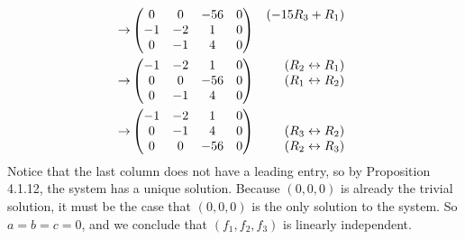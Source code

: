 \documentclass[12pt]{article}
\newenvironment{problem}[2][Problem]
{
	\begin{trivlist} 
		\item[\hskip \labelsep {\bfseries #1 #2:}]
	}
{
	\end{trivlist}
	}
\newenvironment{solution}[1][Solution]
{
	\begin{trivlist} 
		\item[\hskip \labelsep {\itshape #1:}]
	}
	{
	\end{trivlist}
}
\begin{document}
\begin{problem}{3}
\begin{solution}
\begin{align*}
\rightarrow &\begin{pmatrix}0&0&-56&0\\-1&-2&1&0\\0&-1&4&0\end{pmatrix} & \begin{matrix} (-15R_3+R_1)\hphantom{1}\\ \hphantom{1}\\ \hphantom{1}\end{matrix} \\
\rightarrow &\begin{pmatrix}-1&-2&1&0\\0&0&-56&0\\0&-1&4&0\end{pmatrix} & \begin{matrix} (R_2 \leftrightarrow R_1)\hphantom{1}\\ (R_1 \leftrightarrow R_2)\hphantom{1}\\ \hphantom{1}\end{matrix} \\
\rightarrow &\begin{pmatrix}-1&-2&1&0\\0&-1&4&0\\0&0&-56&0\end{pmatrix} & \begin{matrix} \hphantom{1}\\ (R_3 \leftrightarrow R_2)\hphantom{1}\\  (R_2 \leftrightarrow R_3)\hphantom{1}\end{matrix}
\end{align*}
Notice that the last column does not have a leading entry, so by Proposition 4.1.12, the system has a unique solution. Because $(0,0,0)$ is already the trivial solution, it must be the case that $(0,0,0)$ is the only solution to the system. So $a=b=c=0$, and we conclude that $(f_1,f_2,f_3)$ is linearly independent.
\end{solution}
\end{problem}
\end{document}
